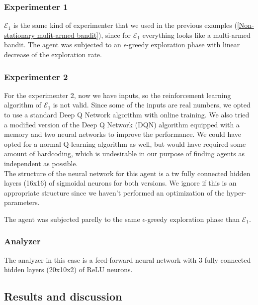 \documentclass[11pt,a4paper,twoside]{report}
\newcommand{\+}{\textnormal{+} }
\theoremstyle{definition}
\numberwithin{equation}{chapter}
\begin{document}
\subsubsection{Experimenter 1}
$\mathscr{E}_1$ is the same kind of experimenter that we used in the previous examples
(\ref{Non-stationary mulit-armed bandit}), since for $\mathscr{E}_1$ everything looks like
a multi-armed bandit. The agent was subjected to an $\epsilon$-greedy 
exploration phase with linear decrease of the exploration rate.
\subsubsection{Experimenter 2}
For the experimenter 2, now we have inputs, so the reinforcement learning
algorithm of $\mathscr{E}_1$ is not valid. Since some of the inputs are real numbers, we
opted to use a standard Deep Q Network \cite{sutton2018reinforcement} algorithm
with online training. We also tried a modified version of the Deep Q Network
(DQN) algorithm equipped with a memory and two neural networks
\cite{mnih2015human} to improve the performance. We could have opted for a
normal Q-learning algorithm as well, but would have required some amount of
hardcoding, which is undesirable in our purpose of finding agents as independent
as possible. \\
\noindent The structure of the neural network for this agent is a tw  fully
connected hidden layers (16x16) of sigmoidal neurons for both versions. We ignore
if this is an appropriate structure since we haven't performed an optimization
of the hyper-parameters.

\noindent The agent was subjected parelly to the same $\epsilon$-greedy
exploration phase than $\mathscr{E}_1$.

\subsubsection{Analyzer}

The analyzer in this case is a feed-forward neural network with 
3 fully connected hidden layers (20x10x2) of ReLU neurons.
\subsection{Results and discussion}
\end{document}
